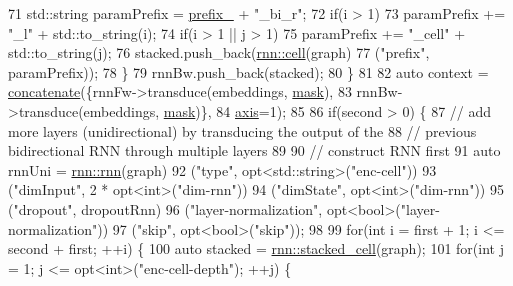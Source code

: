 \begin{DoxyCode}
71         std::string paramPrefix = \hyperlink{classmarian_1_1EncoderBase_abbd764c19ebaae1d6e4ffec0c9930fba}{prefix\_} + \textcolor{stringliteral}{"\_bi\_r"};
72         \textcolor{keywordflow}{if}(i > 1)
73           paramPrefix += \textcolor{stringliteral}{"\_l"} + std::to\_string(i);
74         \textcolor{keywordflow}{if}(i > 1 || j > 1)
75           paramPrefix += \textcolor{stringliteral}{"\_cell"} + std::to\_string(j);
76         stacked.push\_back(\hyperlink{namespacemarian_1_1rnn_af723e51535e0b11de5b28fe19627a3fb}{rnn::cell}(graph)
77                           (\textcolor{stringliteral}{"prefix"}, paramPrefix));
78       \}
79       rnnBw.push\_back(stacked);
80     \}
81 
82     \textcolor{keyword}{auto} context = \hyperlink{namespacemarian_a2791a2c8f79a938f5cb22ae613680675}{concatenate}(\{rnnFw->transduce(embeddings, \hyperlink{namespacemarian_1_1keywords_a201bea6bea8108889b63081132cc3cd7}{mask}),
83                                 rnnBw->transduce(embeddings, \hyperlink{namespacemarian_1_1keywords_a201bea6bea8108889b63081132cc3cd7}{mask})\},
84                                 \hyperlink{namespacemarian_1_1keywords_ace9158eabbddaca833133f12da98b9d6}{axis}=1);
85 
86     \textcolor{keywordflow}{if}(second > 0) \{
87       \textcolor{comment}{// add more layers (unidirectional) by transducing the output of the}
88       \textcolor{comment}{// previous bidirectional RNN through multiple layers}
89 
90       \textcolor{comment}{// construct RNN first}
91       \textcolor{keyword}{auto} rnnUni = \hyperlink{namespacemarian_1_1rnn_aff1b115e415945b445f8d4a2068ec3e8}{rnn::rnn}(graph)
92                     (\textcolor{stringliteral}{"type"}, opt<std::string>(\textcolor{stringliteral}{"enc-cell"}))
93                     (\textcolor{stringliteral}{"dimInput"}, 2 * opt<int>(\textcolor{stringliteral}{"dim-rnn"}))
94                     (\textcolor{stringliteral}{"dimState"}, opt<int>(\textcolor{stringliteral}{"dim-rnn"}))
95                     (\textcolor{stringliteral}{"dropout"}, dropoutRnn)
96                     (\textcolor{stringliteral}{"layer-normalization"}, opt<bool>(\textcolor{stringliteral}{"layer-normalization"}))
97                     (\textcolor{stringliteral}{"skip"}, opt<bool>(\textcolor{stringliteral}{"skip"}));
98 
99       \textcolor{keywordflow}{for}(\textcolor{keywordtype}{int} i = first + 1; i <= second + first; ++i) \{
100         \textcolor{keyword}{auto} stacked = \hyperlink{namespacemarian_1_1rnn_a55385034d5ad19187245bb2b564cb7eb}{rnn::stacked\_cell}(graph);
101         \textcolor{keywordflow}{for}(\textcolor{keywordtype}{int} j = 1; j <= opt<int>(\textcolor{stringliteral}{"enc-cell-depth"}); ++j) \{

\end{DoxyCode}
